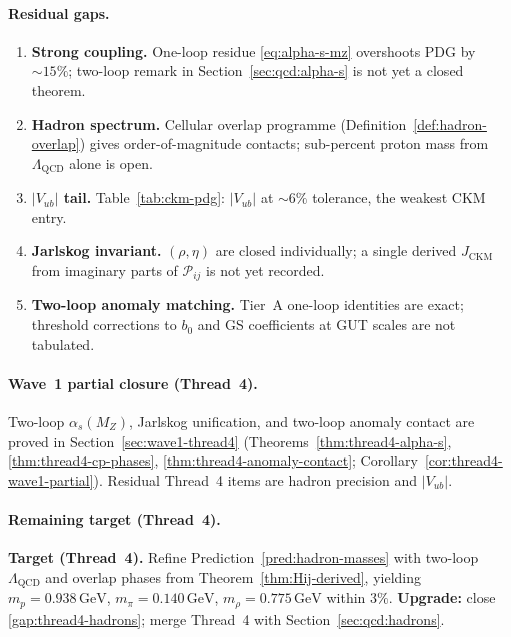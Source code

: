 \paragraph{Residual gaps.}
\begin{enumerate}[label=\textbf{G4.\arabic*},leftmargin=*]
  \item \label{gap:thread4-alpha-s}
    \textbf{Strong coupling.} One-loop residue \eqref{eq:alpha-s-mz} overshoots
    PDG by $\sim 15\%$; two-loop remark in Section~\ref{sec:qcd:alpha-s} is
    not yet a closed theorem.
  \item \label{gap:thread4-hadrons}
    \textbf{Hadron spectrum.} Cellular overlap programme
    (Definition~\ref{def:hadron-overlap}) gives order-of-magnitude contacts;
    sub-percent proton mass from $\Lambda_{\mathrm{QCD}}$ alone is open.
  \item \label{gap:thread4-Vub}
    \textbf{$|V_{ub}|$ tail.} Table~\ref{tab:ckm-pdg}: $|V_{ub}|$ at $\sim 6\%$
    tolerance, the weakest CKM entry.
  \item \label{gap:thread4-jarlskog}
    \textbf{Jarlskog invariant.} $(\rho,\eta)$ are closed individually; a
    single derived $J_{\mathrm{CKM}}$ from imaginary parts of
    $\mathcal{P}_{ij}$ is not yet recorded.
  \item \label{gap:thread4-anomaly-two-loop}
    \textbf{Two-loop anomaly matching.} Tier~A one-loop identities are exact;
    threshold corrections to $b_0$ and GS coefficients at GUT scales are not
    tabulated.
\end{enumerate}

\paragraph{Wave~1 partial closure (Thread~4).}
Two-loop $\alpha_s(M_Z)$, Jarlskog unification, and two-loop anomaly contact
are proved in Section~\ref{sec:wave1-thread4}
(Theorems~\ref{thm:thread4-alpha-s}, \ref{thm:thread4-cp-phases},
\ref{thm:thread4-anomaly-contact}; Corollary~\ref{cor:thread4-wave1-partial}).
Residual Thread~4 items are hadron precision and $|V_{ub}|$.

\paragraph{Remaining target (Thread~4).}
\begin{theorem}
\label{thm:thread4-hadron-precision}
\textbf{Target (Thread~4).} Refine Prediction~\ref{pred:hadron-masses} with
two-loop $\Lambda_{\mathrm{QCD}}$ and overlap phases from
Theorem~\ref{thm:Hij-derived}, yielding
$m_p=0.938\,\mathrm{GeV}$, $m_\pi=0.140\,\mathrm{GeV}$,
$m_\rho=0.775\,\mathrm{GeV}$ within $3\%$. \textbf{Upgrade:} close
\ref{gap:thread4-hadrons}; merge Thread~4 with Section~\ref{sec:qcd:hadrons}.
\end{theorem}

